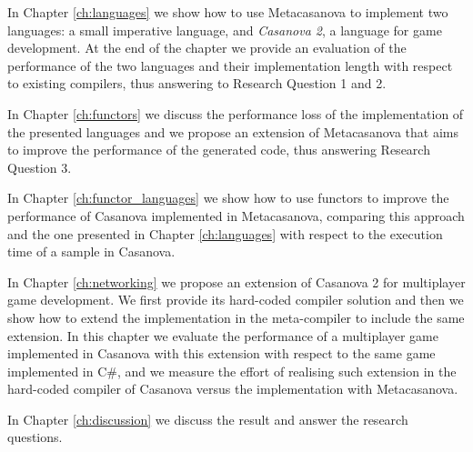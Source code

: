 In Chapter \ref{ch:languages} we show how to use Metacasanova to implement two languages: a small imperative language, and \textit{Casanova 2}, a language for game development. At the end of the chapter we provide an evaluation of the performance of the two languages and their implementation length with respect to existing compilers, thus answering to Research Question 1 and 2.

In Chapter \ref{ch:functors} we discuss the performance loss of the implementation of the presented languages and we propose an extension of Metacasanova that aims to improve the performance of the generated code, thus answering Research Question 3.

In Chapter \ref{ch:functor_languages} we show how to use functors to improve the performance of Casanova implemented in Metacasanova, comparing this approach and the one presented in Chapter \ref{ch:languages} with respect to the execution time of a sample in Casanova. 

In Chapter \ref{ch:networking} we propose an extension of Casanova 2 for multiplayer game development. We first provide its hard-coded compiler solution and then we show how to extend the implementation in the meta-compiler to include the same extension. In this chapter we evaluate the performance of a multiplayer game implemented in Casanova with this extension with respect to the same game implemented in C\#, and we measure the effort of realising such extension in the hard-coded compiler of Casanova versus the implementation with Metacasanova.

In Chapter \ref{ch:discussion} we discuss the result and answer the research questions.